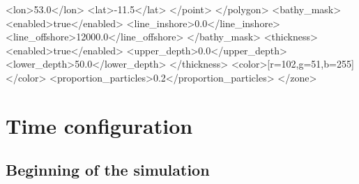 \documentclass[
  letterpaper,
  DIV=11,
  numbers=noendperiod]{scrreprt}
\newenvironment{Shaded}{\begin{snugshade}}{\end{snugshade}}
\newcommand{\KeywordTok}[1]{\textcolor[rgb]{0.00,0.23,0.31}{#1}}
\newcommand{\NormalTok}[1]{\textcolor[rgb]{0.00,0.23,0.31}{#1}}
\begin{document}
\begin{Shaded}
\begin{Highlighting}[]
\NormalTok{            \textless{}}\KeywordTok{lon}\NormalTok{\textgreater{}53.0\textless{}/}\KeywordTok{lon}\NormalTok{\textgreater{}}
\NormalTok{            \textless{}}\KeywordTok{lat}\NormalTok{\textgreater{}{-}11.5\textless{}/}\KeywordTok{lat}\NormalTok{\textgreater{}}
\NormalTok{        \textless{}/}\KeywordTok{point}\NormalTok{\textgreater{}}
\NormalTok{    \textless{}/}\KeywordTok{polygon}\NormalTok{\textgreater{}}
\NormalTok{    \textless{}}\KeywordTok{bathy\_mask}\NormalTok{\textgreater{}}
\NormalTok{        \textless{}}\KeywordTok{enabled}\NormalTok{\textgreater{}true\textless{}/}\KeywordTok{enabled}\NormalTok{\textgreater{}}
\NormalTok{        \textless{}}\KeywordTok{line\_inshore}\NormalTok{\textgreater{}0.0\textless{}/}\KeywordTok{line\_inshore}\NormalTok{\textgreater{}}
\NormalTok{        \textless{}}\KeywordTok{line\_offshore}\NormalTok{\textgreater{}12000.0\textless{}/}\KeywordTok{line\_offshore}\NormalTok{\textgreater{}}
\NormalTok{    \textless{}/}\KeywordTok{bathy\_mask}\NormalTok{\textgreater{}}
\NormalTok{    \textless{}}\KeywordTok{thickness}\NormalTok{\textgreater{}}
\NormalTok{        \textless{}}\KeywordTok{enabled}\NormalTok{\textgreater{}true\textless{}/}\KeywordTok{enabled}\NormalTok{\textgreater{}}
\NormalTok{        \textless{}}\KeywordTok{upper\_depth}\NormalTok{\textgreater{}0.0\textless{}/}\KeywordTok{upper\_depth}\NormalTok{\textgreater{}}
\NormalTok{        \textless{}}\KeywordTok{lower\_depth}\NormalTok{\textgreater{}50.0\textless{}/}\KeywordTok{lower\_depth}\NormalTok{\textgreater{}}
\NormalTok{        \textless{}/}\KeywordTok{thickness}\NormalTok{\textgreater{}}
\NormalTok{    \textless{}}\KeywordTok{color}\NormalTok{\textgreater{}[r=102,g=51,b=255]\textless{}/}\KeywordTok{color}\NormalTok{\textgreater{}}
\NormalTok{    \textless{}}\KeywordTok{proportion\_particles}\NormalTok{\textgreater{}0.2\textless{}/}\KeywordTok{proportion\_particles}\NormalTok{\textgreater{}}
\NormalTok{\textless{}/}\KeywordTok{zone}\NormalTok{\textgreater{}}
\end{Highlighting}
\end{Shaded}

\section{Time configuration}\label{sec-time-config}

\subsection{Beginning of the
simulation}\label{beginning-of-the-simulation}
\end{document}

